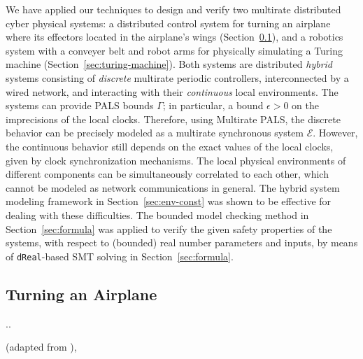 We have applied our techniques to 
design and verify two  multirate distributed cyber physical systems:
a distributed control system for turning an airplane where its effectors located 
in the airplane's wings (Section~\ref{sec:airplane}),
and a robotics system with  a conveyer belt and robot arms
for physically simulating a Turing machine (Section~\ref{sec:turing-machine}).
%
Both systems are  distributed \emph{hybrid} systems
consisting of \emph{discrete} multirate periodic controllers, interconnected by a wired network,
and 
interacting with their \emph{continuous} local environments.
The systems can provide PALS bounds $\Gamma$;
in particular, 
a bound $\epsilon > 0$ on the imprecisions of the local clocks.
%
Therefore, using Multirate PALS,
the discrete behavior can be precisely modeled 
as a multirate synchronous system $\mathcal{E}$.
However, the continuous behavior
still depends on the exact values of the local clocks,
given by clock synchronization mechanisms.
The local physical environments of different components 
can be simultaneously correlated to each other,
which cannot be modeled as network communications in general.
The hybrid system modeling framework in Section~\ref{sec:env-const}
was shown to be effective for dealing with these difficulties.
The bounded model checking method in Section~\ref{sec:formula}
was applied to verify
the  given safety properties of the systems,
with respect to (bounded) real number parameters and inputs,
by means of \texttt{dReal}-based SMT solving in Section~\ref{sec:formula}.






\subsection{Turning an Airplane}
\label{sec:airplane}
..

(adapted from \cite{ftscs-journal}),


